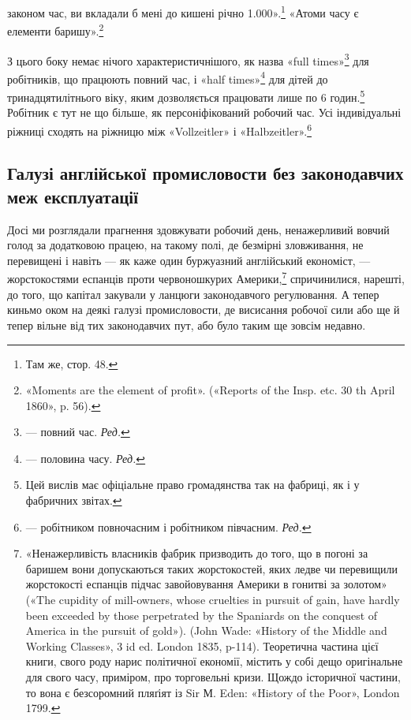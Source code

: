 \parcont{}  %
законом час, ви вкладали б мені до кишені річно 1.000».\footnote{
Там же, стор. 48.
} «Атоми часу є елементи баришу».\footnote{
«Moments are the element of profit». («Reports of the Insp. etc.
30 th April 1860», p. 56).
}

З цього боку немає нічого характеристичнішого, як назва
«full times»\footnote*{
— повний час. \emph{Ред.}
} для робітників, що працюють повний час, і «half
times»\footnote*{
— половина часу. \emph{Ред.}
} для дітей до тринадцятилітнього віку, яким дозволяється
працювати лише по 6 годин.\footnote{
Цей вислів має офіціальне право громадянства так на фабриці,
як і у фабричних звітах.
} Робітник є тут не що більше,
як персоніфікований робочий час. Усі індивідуальні ріжниці
сходять на ріжницю між «Vollzeitler» і «Halbzeitler».\footnote*{
— робітником повночасним і робітником півчасним. \emph{Ред.}
}

\subsection{
Галузі англійської промисловости без законодавчих меж
експлуатації
}

Досі ми розглядали прагнення здовжувати робочий день,
ненажерливий вовчий голод за додатковою працею, на такому
полі, де безмірні зловживання, не перевищені і навіть — як каже
один буржуазний англійський економіст, — жорстокостями еспанців
проти червоношкурих Америки,\footnote{
«Ненажерливість власників фабрик призводить до того, що в погоні
за баришем вони допускаються таких жорстокостей, яких ледве чи
перевищили жорстокості еспанців підчас завойовування Америки в гонитві
за золотом» («The cupidity of mill-owners, whose cruelties in pursuit
of gain, have hardly been exceeded by those perpetrated by the Spaniards
on the conquest of America in the pursuit of gold»). (John Wade:
«History of the Middle and Working Classes», 3 id ed. London 1835, p-114).
Теоретична частина цієї книги, свого роду нарис політичної економії,
містить у собі дещо оригінальне для свого часу, приміром, про торговельні
кризи. Щождо історичної частини, то вона є безсоромний пляґіят із Sir
М. Eden: «History of the Poor», London 1799.
} спричинилися, нарешті,
до того, що капітал закували у ланцюги законодавчого регулювання.
А тепер киньмо оком на деякі галузі промисловости, де
висисання робочої сили або ще й тепер вільне від тих законодавчих
пут, або було таким ще зовсім недавно.

